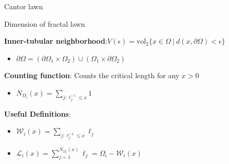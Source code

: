 \documentclass{if-beamer}
\begin{document}
\begin{frame}{Cantor lawn}
	\begin{center}
	\end{center}
\end{frame}

\begin{frame}{Dimension of fractal lawn}

{\bf Inner-tubular neighborhood}:\quad $V(\epsilon) = \text{vol}_2\{x \in \Omega\ |\ d(x,\partial\Omega) < \epsilon\}$

\begin{itemize}
	\item $\partial\Omega=(\partial\Omega_1\times\Omega_2)\cup(\Omega_1\times\partial\Omega_2)$
\end{itemize}
\vspace{.2in}

{\bf Counting function}: Counts the critical length for any $x > 0$
\begin{itemize}
	\item $N_{\Omega_i}(x) = \sum_{j: \ell_j^{-1} \leq x}1$
\end{itemize}
\vspace{.2in}

{\bf Useful Definitions}:
\begin{itemize}
	\item $\mathcal{W}_i(x)=\sum_{j: \ell_j^{-1} \leq x}\ell_j$
	\item $\mathcal{L}_i(x)=\sum_{j = 1}^{N_{\Omega_i}(x)}\ell_j=\Omega_i-\mathcal{W}_i(x)$
\end{itemize}


\end{frame}
\end{document}
